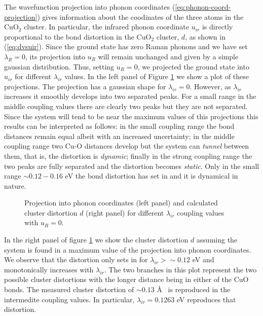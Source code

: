 The wavefunction projection into phonon coordinates (\ref{eq:phonon-coord-projection}) gives information about the coodinates of the three atoms in the CuO$_2$ cluster.
In particular, the infrared phonon coordinate $u_{ir}$ is directly proportional to the bond distortion in the CuO$_2$ cluster, $d$, as shown in (\ref{eq:dvsuir}).
Since the ground state has zero Raman phonons and we have set $\lambda_R=0$, its projection into $u_R$ will remain unchanged and given by a simple gaussian distribution.
Thus, setting $u_R=0$, we projected the ground state into $u_{ir}$ for different $\lambda_{ir}$ values.
In the left panel of Figure \ref{fig:uirCoupl} we show a plot of these projections.
The projection has a gaussian shape for $\lambda_{ir}=0$.
However, as $\lambda_{ir}$ increases it smoothly develops into two separated peaks.
For a small range in the middle coupling values there are clearly two peaks but they are not separated. 
Since the system will tend to be near the maximum values of this projections this results can be interpreted as follows: in the small coupling range the bond distances remain equal albeit with an increased uncertainty; in the middle coupling range two Cu-O distances develop but the system can \textit{tunnel} between them, that is, the distortion is \textit{dynamic}; finally in the strong coupling range the two peaks are fully separated and the distortion becomes \textit{static}.
Only in the small range $\sim 0.12 - 0.16$ eV the bond distortion has set in and it is dynamical in nature.
%
\begin{figure}[ht]
  \centering
  
  \caption{Projection into phonon coordinates (left panel) and calculated cluster distortion $d$ (right panel) for different $\lambda_{ir}$ coupling values with $u_R=0$.}
  \label{fig:uirCoupl}
\end{figure}

In the right panel of figure \ref{fig:uirCoupl} we show the cluster distortion $d$ assuming the system is found in a maximum value of the projection into phonon coordinates.
We observe that the distortion only sets in for $\lambda_{ir} > \sim 0.12$ eV and monotonically increases with $\lambda_{ir}$.
The two branches in this plot represent the two possible cluster distortions with the longer distance being in either of the CuO bonds.
The measured cluster distortion of $\sim 0.13$ \AA\ \cite{MustredeLeon1990} is reproduced in the intermedite coupling values. 
In particular, $\lambda_{ir}=0.1263$ eV reproduces that distortion.

